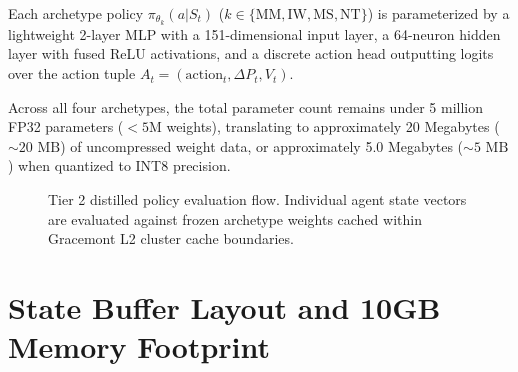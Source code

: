 Each archetype policy $\pi_{\theta_k}(a | S_t)$ ($k \in \{\text{MM}, \text{IW}, \text{MS}, \text{NT}\}$) is parameterized by a lightweight 2-layer MLP with a 151-dimensional input layer, a 64-neuron hidden layer with fused ReLU activations, and a discrete action head outputting logits over the action tuple $A_t = (\text{action}_t, \Delta P_t, V_t)$. 

Across all four archetypes, the total parameter count remains under 5 million FP32 parameters ($<5\text{M}$ weights), translating to approximately 20 Megabytes ($\sim 20\text{ MB}$) of uncompressed weight data, or approximately 5.0 Megabytes ($\sim 5\text{ MB}$) when quantized to INT8 precision.

\begin{figure}[htbp]
\centering
{}
\caption{Tier 2 distilled policy evaluation flow. Individual agent state vectors are evaluated against frozen archetype weights cached within Gracemont L2 cluster cache boundaries.}
\label{fig:tier2_eval_flow}
\end{figure}

\section{State Buffer Layout and 10GB Memory Footprint}

